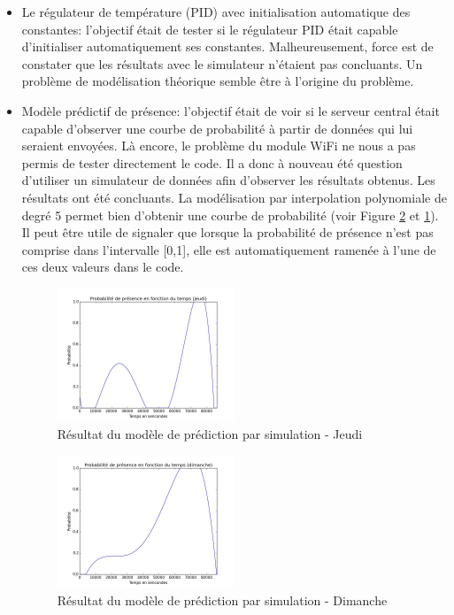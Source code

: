 \documentclass[11pt,a4paper,11pt]{report}
\begin{document}
\begin{itemize}[noitemsep]

\item Le régulateur de température (PID) avec initialisation automatique des constantes: l'objectif était de tester si le régulateur PID était capable d'initialiser automatiquement ses constantes. Malheureusement, force est de constater que les résultats avec le simulateur n'étaient pas concluants. Un problème de modélisation théorique semble être à l'origine du problème.\\


\item Modèle prédictif de présence: l'objectif était de voir si le serveur central était capable d'observer une courbe de probabilité à partir de données qui lui seraient envoyées. Là encore, le problème du module WiFi ne nous a pas permis de tester directement le code. Il a donc à nouveau été question d'utiliser un simulateur de données afin d'observer les résultats obtenus. Les résultats ont été concluants. La modélisation par interpolation polynomiale de degré 5 permet bien d'obtenir une courbe de probabilité (voir Figure \ref{proba1} et \ref{proba2}). Il peut être utile de signaler que lorsque la probabilité de présence n'est pas comprise dans l'intervalle [0,1], elle est automatiquement ramenée à l'une de ces deux valeurs dans le code.\\

\begin{figure}[h]
\centering
\includegraphics[width=0.5\textwidth]{images/proba2.jpg}
\caption{Résultat du modèle de prédiction par simulation - Jeudi}
\label{proba2}
\end{figure}

\begin{figure}[h]
\centering
\includegraphics[width=0.5\textwidth]{images/proba1.jpg}
\caption{Résultat du modèle de prédiction par simulation - Dimanche}
\label{proba1}
\end{figure}

\end{itemize}
\end{document}
